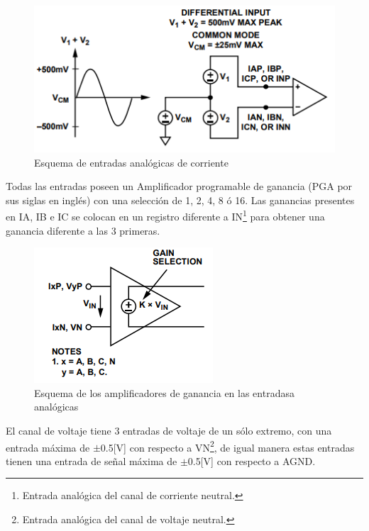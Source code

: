 \documentclass[letterpaper,12pt,oneside]{book}
\begin{document}
				\begin{figure}[!htpb]
					\centering
					\includegraphics[scale = 1.0]{Material de Consulta/EntAnCrrnt.PNG}
					\caption[Entradas analógicas de corriente]{Esquema de entradas analógicas de corriente}
					\label{EntCrnt}
				\end{figure}

				Todas las entradas poseen un Amplificador programable de ganancia (PGA por sus siglas en inglés) con una selección de 1, 2, 4, 8 ó 16. Las ganancias presentes en IA, IB e IC se colocan en un registro diferente a IN\footnote{Entrada analógica del canal de corriente neutral.} para obtener una ganancia diferente a las 3 primeras.

				\begin{figure}[!htpb]
					\centering
					\includegraphics[scale = 1.0]{Material de Consulta/AmpGan.PNG}
					\caption[Amplificadores de Ganancia]{Esquema de los amplificadores de ganancia en las entradasa analógicas}
					\label{AmpGan}
				\end{figure}

				El canal de voltaje tiene 3 entradas de voltaje de un sólo extremo, con una entrada máxima de  $\pm$0.5[V] con respecto a VN\footnote{Entrada analógica del canal de voltaje neutral.},
				de igual manera estas entradas tienen una entrada de señal máxima de $\pm$0.5[V] con respecto a AGND.
\end{document}

